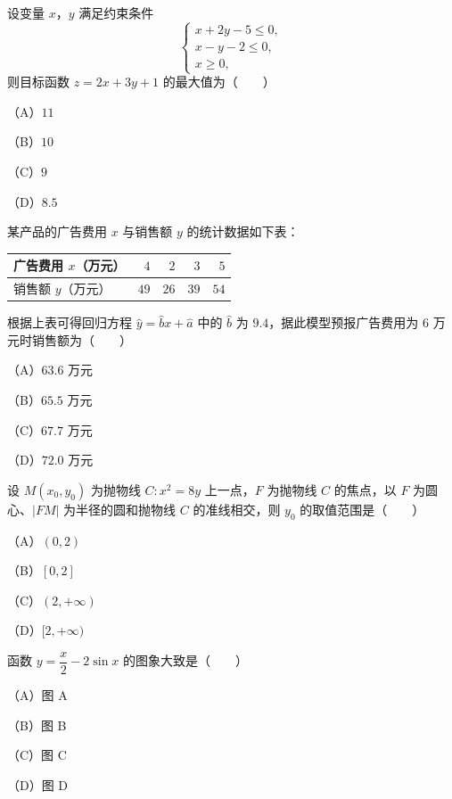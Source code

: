\begin{question}
设变量 $x$，$y$ 满足约束条件
\nopagebreak[4]
\[
\begin{cases}
x+2y-5\leqslant 0,\\
x-y-2\leqslant 0,\\
x\geqslant 0,
\end{cases}
\]
则目标函数 $z=2x+3y+1$ 的最大值为\mbox{（　　）}

（A）$11$

（B）$10$

（C）$9$

（D）$8.5$

\end{question}
\begin{question}
某产品的广告费用 $x$ 与销售额 $y$ 的统计数据如下表：

\begin{center}
\begin{tabular}{lrrrr}
\toprule
广告费用 $x$（万元） & $4$ & $2$ & $3$ & $5$ \\
\midrule
销售额 $y$（万元） & $49$ & $26$ & $39$ & $54$ \\
\bottomrule
\end{tabular}
\end{center}

根据上表可得回归方程 $\hat y=\hat bx+\hat a$ 中的 $\hat b$ 为 $9.4$，据此模型预报广告费用为 $6$ 万元时销售额为\mbox{（　　）}

（A）$63.6$ 万元

（B）$65.5$ 万元

（C）$67.7$ 万元

（D）$72.0$ 万元

\end{question}
\begin{question}
设 $M(x_0,y_0)$ 为抛物线 $C:x^2=8y$ 上一点，$F$ 为抛物线 $C$ 的焦点，以 $F$ 为圆心、$|FM|$ 为半径的圆和抛物线 $C$ 的准线相交，则 $y_0$ 的取值范围是\mbox{（　　）}

（A）$(0,2)$

（B）$[0,2]$

（C）$(2,+\infty)$

（D）$[2,+\infty)$

\Needspace{0.4\textheight}
\end{question}
\begin{question}
函数 $y=\dfrac x2-2\sin x$ 的图象大致是\mbox{（　　）}

（A）图 A

（B）图 B

（C）图 C

（D）图 D
\nopagebreak[4]
\begin{center}\end{center}
\nopagebreak[4]
\Needspace{0.4\textheight}
\end{question}
